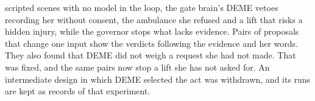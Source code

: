 scripted scenes with no model in the loop, the gate brain's DEME vetoes recording her without
consent, the ambulance she refused and a lift that risks a hidden injury, while the governor stops
what lacks evidence. Pairs of proposals that change one input show the verdicts following the
evidence and her words. They also found that DEME did not weigh a request she had not made. That was fixed, and the same pairs now stop a lift she has not asked for. An intermediate design in which DEME selected the act was withdrawn, and its runs
are kept as records of that experiment.
